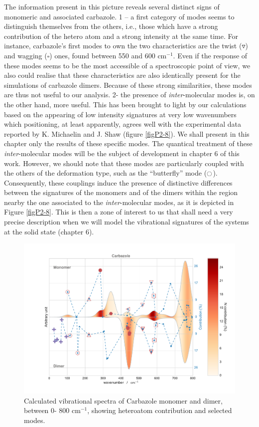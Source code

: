 	The information present in this picture reveals several distinct signs of monomeric and associated carbazole. 1 – a first category of modes seems to distinguish themselves from the others, i.e., those which have a strong contribution of the hetero atom and a strong intensity at the same time. For instance, carbazole’s first modes to own the two characteristics are the twist ($\triangledown$) and wagging ($\square$) ones, found between 550 and 600 cm$^{-1}$. Even if the response of these modes seems to be the most accessible of a spectroscopic point of view, we also could realise that these characteristics are also identically present for the simulations of carbazole dimers. Because of these strong similarities, these modes are thus not useful to our analysis. 2- the presence of \textit{inter}-molecular modes is, on the other hand, more useful. This has been brought to light by our calculations based on the appearing of low intensity signatures at very low wavenumbers which positioning, at least apparently, agrees well with the experimental data reported by K. Michaelin and J. Shaw (figure \ref{figP2-8}). We shall present in this chapter only the results of these specific modes. The quantical treatment of these \textit{inter}-molecular modes will be the subject of development in chapter 6 of this work. However, we should note that these modes are particularly coupled with the others of the deformation type, such as the “butterfly” mode ($\ocircle$). 
	 Consequently, these couplings induce the presence of distinctive differences between the signatures of the monomers and of the dimers within the region nearby the one associated to the \textit{inter}-molecular modes, as it is depicted in Figure \ref{figP2-8}. This is then a zone of interest to us that shall need a very precise description when we will model the vibrational signatures of the systems at the solid state (chapter 6).
	 
	 
	 	\begin{figure}[H]
	 		\begin{center}
	 			\includegraphics[scale=0.5]{image/P2-7}
	 		\end{center}
	 		\caption{Calculated vibrational spectra of Carbazole monomer and dimer, between 0- 800 cm$^{-1}$, showing heteroatom contribution and selected modes.}  \label{figP2-7}
	 	\end{figure}
	 	

